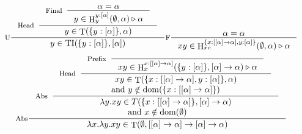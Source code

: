 \documentclass{beamer}
\DeclareMathOperator{\iT}{T}
\DeclareMathOperator{\iH}{H}
\DeclareMathOperator{\iTI}{TI}
\DeclareMathOperator{\iDom}{dom}
\begin{document}
    \begin{frame}
        \begin{displaymath}
        \makebox[\textwidth][c]{
        \inference[U]
        {\inference[Head]
            {\inference[Final]
                {\alpha = \alpha}
                {y \in \iH^{y:[\alpha]}_y(\emptyset, \alpha) \triangleright \alpha}
            }
            {y \in \iT(\{y:[\alpha]\}, \alpha)}
        }
        {y \in \iTI(\{y:[\alpha]\}, [\alpha])}
        
        \inference[F]
        {\alpha = \alpha}
        {xy \in \iH^{\{x:[[\alpha]->\alpha], y : [\alpha]\}}_{xc}(\emptyset, \alpha) \triangleright \alpha}
    }
        \end{displaymath}
            \begin{displaymath}
            \makebox[\textwidth][c]{
            
        
            \inference[Abs]
            {\inference[Abs]
                {\inference[Head]
                    {\inference[Prefix]
                        {
                        }
                        {xy \in \iH^{x : [[\alpha] -> \alpha]}_x(\{y:[\alpha]\}, [\alpha] -> \alpha) \triangleright \alpha}
                    }
                    {xy \in \iT(\{x : [[\alpha] -> \alpha], y : [\alpha]\}, \alpha)} \\\text{and } y \notin \iDom(\{x : [[\alpha] -> \alpha]\})}
                {\lambda y.xy \in T(\{x : [[\alpha] -> \alpha]\}, [\alpha] -> \alpha)} \\\text{and } x \notin \iDom(\emptyset)}
            {\lambda x.\lambda y.xy \in \iT(\emptyset, [[\alpha] -> \alpha] -> [\alpha] -> \alpha)}
        
        }
        \end{displaymath}
    \end{frame}
    
    
\end{document}

